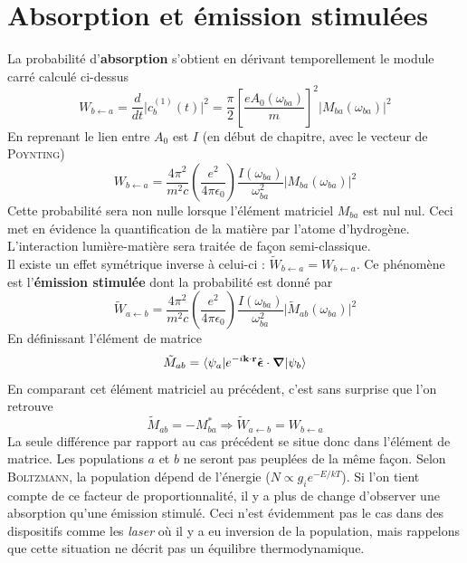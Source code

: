 \section{Absorption et émission stimulées}
La probabilité d'\textbf{absorption} s'obtient en dérivant temporellement le module carré calculé 
ci-dessus
\begin{equation}
W_{b \leftarrow a} =
\frac{d}{dt} \vert c_b^{(1)} (t) \vert ^2 =
\frac{\pi}{2} \left[ \frac{e A_0 (\omega_{ba}) }{m} \right] ^2 
\vert M_{ba} (\omega_{ba}) \vert ^2
\end{equation}
En reprenant le lien entre $A_0$ est $I$ (en début de chapitre, avec le vecteur de \textsc{Poynting})
\begin{equation}
W_{b \leftarrow a} =\frac{4 \pi ^2}{m^2 c} \left( \frac{e^2}{4 \pi \epsilon_0 } \right)
\frac{I( \omega_{ba}) }{\omega_{ba}^2 } \vert M_{ba} (\omega_{ba}) \vert ^2
\end{equation}
Cette probabilité sera  non nulle lorsque l'élément matriciel $M_{ba}$ est nul nul. Ceci met en 
évidence la quantification de la matière par l'atome d'hydrogène. L'interaction lumière-matière sera
traitée de façon semi-classique. \\

Il existe un effet symétrique inverse à celui-ci : $\tilde W_{b\leftarrow a}=W_{b\leftarrow a}$. Ce
phénomène est l'\textbf{émission stimulée} dont la probabilité est donné par
\begin{equation}
\tilde{W}_{a \leftarrow b} = \frac{4 \pi ^2}{m^2 c} \left( \frac{e^2}{4 \pi \epsilon_0 } \right)
\frac{I( \omega_{ba}) }{\omega_{ba}^2 } \vert \tilde{M}_{ab} (\omega_{ba}) \vert ^2
\end{equation}
En définissant l'élément de matrice
\begin{equation}
\tilde{M}_{ab} = \langle \psi_a \vert e^{-i {\bf k} \cdot {\bf r} }
  \hat{  \mbox{\boldmath $ \epsilon $}} \cdot \mbox{\boldmath $ \nabla $} \vert \psi_b \rangle
\end{equation}
En comparant cet élément matriciel au précédent, c'est sans surprise que l'on retrouve
\begin{equation}
\tilde{M}_{ab} = - M_{ba}^{\ast} \Rightarrow \tilde{W}_{a \leftarrow b} = W_{b \leftarrow a}
\end{equation}
La seule différence par rapport au cas précédent se situe donc dans l'élément de matrice. Les 
populations $a$ et $b$ ne seront pas peuplées de la même façon. Selon \textsc{Boltzmann}, la 
population dépend de l'énergie ($N\propto g_ie^{-E/kT}$). Si l'on tient compte de ce facteur 
de proportionnalité, il y a plus de change d'observer une absorption qu'une émission stimulé. Ceci
n'est évidemment pas le cas dans des dispositifs comme les \textit{laser} où il y a eu inversion 
de la population, mais rappelons que cette situation ne décrit pas un équilibre thermodynamique.



